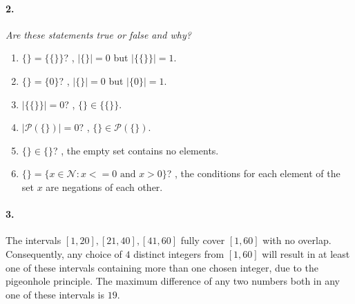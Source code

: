 \documentclass[12pt]{article}
\newcommand{\qa}{\\[0.5\baselineskip]}  %
\newcommand{\ps}{\mathcal{P}}
\begin{document}
\paragraph{2.}
\textit{Are these statements true or false and why?}
\begin{enumerate}[label=\textbf{\alph*.}]
    \item $\{\} = \{\{\}\}$? , $|\{\}| = 0$ but $|\{\{\}\}| = 1$.
    \item $\{\} = \{0\}$? , $|\{\}| = 0$ but $|\{0\}| = 1$.
    \item $|\{\{\}\}| = 0$? , $\{\} \in \{\{\}\}$.
    \item $|\ps(\{\})| = 0$? , $\{\} \in \ps(\{\})$.
    \item $\{\} \in \{\}$? , the empty set contains no elements.
    \item $\{\} = \{x \in \mathcal{N}: x <= 0 \text{ and } x > 0\}$? , the
    conditions for each element of the set $x$ are negations of each other.
\end{enumerate}

\paragraph{3.}
The intervals $[1, 20], [21, 40], [41, 60]$ fully cover $[1, 60]$ with no overlap. Consequently,
any choice of $4$ distinct integers from $[1, 60]$ will result in at least one of these intervals
containing more than one chosen integer, due to the pigeonhole principle. The maximum difference
of any two numbers both in any one of these intervals is $19$.
\end{document}
